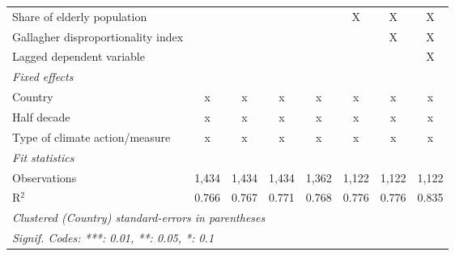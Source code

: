 \begin{tabular}{lccccccc}
   Share of elderly population                                                               &         &         &              &         & X            & X            & X\\  
   Gallagher disproportionality index                                                        &         &         &              &         &              & X            & X\\  
   Lagged dependent variable                                                                 &         &         &              &         &              &              & X\\  
   \emph{Fixed effects}\\
   Country                                                                                   & x       & x       & x            & x       & x            & x            & x\\  
   Half decade                                                                               & x       & x       & x            & x       & x            & x            & x\\  
   Type of climate action/measure                                                            & x       & x       & x            & x       & x            & x            & x\\  
   \midrule \emph{Fit statistics}\\
   Observations                                                                              & 1,434   & 1,434   & 1,434        & 1,362   & 1,122        & 1,122        & 1,122\\  
   R$^2$                                                                                     & 0.766   & 0.767   & 0.771        & 0.768   & 0.776        & 0.776        & 0.835\\  
   \midrule
   \multicolumn{8}{l}{\emph{Clustered (Country) standard-errors in parentheses}}\\
   \multicolumn{8}{l}{\emph{Signif. Codes: ***: 0.01, **: 0.05, *: 0.1}}\\
\end{tabular}
\par\endgroup


